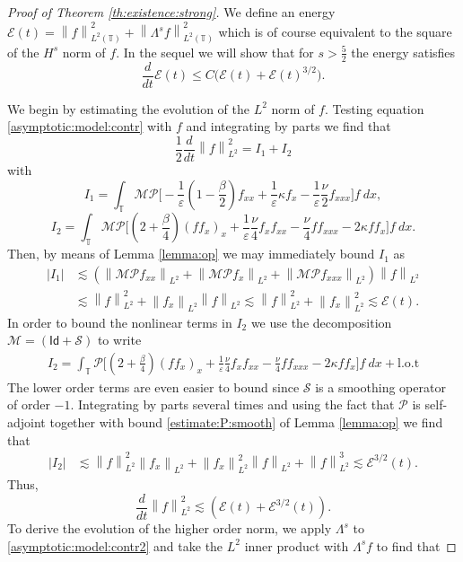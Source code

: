\documentclass[reqno]{amsart}
\newcommand{\TT}{\mathbb T}
\newcommand{\norm}[1]{\left\lVert#1\right\rVert}
\newcommand\abs[1]{\left|#1\right|}
\theoremstyle{definition}
\numberwithin{equation}{section}
\numberwithin{theorem}{section}
\numberwithin{definition}{section}
\begin{document}
\begin{proof}[Proof of Theorem \ref{th:existence:strong}]
We define an energy $\mathcal{E}(t)=\norm{f}_{L^{2}(\TT)}^{2}+ \norm{\Lambda^{s}f}_{L^{2}(\TT)}^{2}$ which is of course equivalent to the square of the $H^{s}$ norm of $f$. In the sequel 
we will show that for $s>\frac{5}{2}$ the energy satisfies
\[
\frac{d}{dt}\mathcal{E}(t)\le C\big(\mathcal{E}(t)+\mathcal{E}(t)^{3/2}\big).
\]


 We begin by estimating the evolution of the $L^{2}$ norm of $f$. Testing equation \eqref{asymptotic:model:contr} with $f$ and integrating by parts we find that
\[
\frac{1}{2}\frac{d}{dt}\norm{f}_{L^{2}}^{2}= I_{1}+I_{2} 
\]
with 
\[I_{1}= \int_{\TT} \mathcal{M}\mathcal{P}\bigg[ - \frac{1}{\varepsilon}(1-\frac{\beta}{2})f_{xx}+ \frac{1}{\varepsilon}\kappa f_{x}- \frac{1}{\varepsilon}\frac{\nu}{2}f_{xxx}\bigg] f \ dx,\]
\[I_{2}=\int_{\TT} \mathcal{M}\mathcal{P}\bigg[\left(2+\frac{\beta}{4}\right)(f f_{x})_{x} + \frac{1}{\varepsilon}\frac{\nu}{4}f_{x}f_{xx}  -\frac{\nu}{4}ff_{xxx}-2\kappa ff_{x}\bigg]f \ dx. \]
Then, by means of Lemma \eqref{lemma:op} we may immediately bound $I_{1}$ as
\begin{align*}
\abs{I_{1}}&\lesssim \left(\norm{\mathcal{M}\mathcal{P}f_{xx}}_{L^{2}}+\norm{\mathcal{M}\mathcal{P}f_{x}}_{L^{2}}+\norm{\mathcal{M}\mathcal{P}f_{xxx}}_{L^{2}}\right)\norm{f}_{L^{2}} \\
&\lesssim  \norm{f}_{L^{2}}^{2}+\norm{f_{x}}_{L^{2}}\norm{f}_{L^2}\lesssim  \norm{f}_{L^{2}}^{2}+\norm{f_{x}}_{L^{2}}^{2}\lesssim \mathcal{E}(t).
\end{align*}
In order to bound the nonlinear terms in $I_{2}$ we use the decomposition $\mathcal{M}=(\mathsf{Id}+\mathcal{S})$ to write
\begin{align*}
I_{2}=\int_{\TT}\mathcal{P}\bigg[\left(2+\frac{\beta}{4}\right)(f f_{x})_{x} + \frac{1}{\varepsilon}\frac{\nu}{4}f_{x}f_{xx} -\frac{\nu}{4}ff_{xxx}-2\kappa ff_{x}\bigg]f \ dx + \mbox{l.o.t}
\end{align*}
The lower order terms are even easier to bound since $\mathcal{S}$ is a smoothing operator of order $-1$.  Integrating by parts several times and using the fact that $\mathcal{P}$ is self-adjoint together with bound \eqref{estimate:P:smooth} of Lemma \ref{lemma:op} we find that
\begin{align*}
\abs{I_{2}}&\lesssim \norm{f}_{L^{2}}^{2}\norm{f_{x}}_{L^{2}}+\norm{f_{x}}_{L^{2}}^{2}\norm{f}_{L^{2}}+\norm{f}_{L^{2}}^{3}\lesssim  \mathcal{E}^{3/2}(t).
\end{align*}
Thus,
\begin{equation}\label{estimate:L2}
\frac{d}{dt}\norm{f}_{L^{2}}^{2}\lesssim \left( \mathcal{E}(t)+\mathcal{E}^{3/2}(t) \right).
\end{equation}
To derive the evolution of the higher order norm, we apply $\Lambda^s$ to \eqref{asymptotic:model:contr2} and take the $L^2$ inner product with $\Lambda^s f$ to find that


\end{proof}
\end{document}
